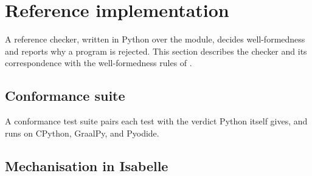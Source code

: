\section{Reference implementation}
\label{sec:reference-impl}

A reference checker, written in Python over the  module, decides well-formedness and
reports why a program is rejected. This section describes the checker and its correspondence with the
well-formedness rules of .

\subsection{Conformance suite}
\label{sec:testing}

A conformance test suite pairs each test with the verdict Python itself gives, and runs on CPython, 
GraalPy, and Pyodide. 

\subsection{Mechanisation in Isabelle}
\label{sec:mechanisation}

